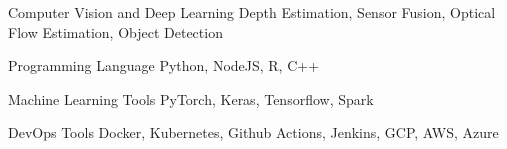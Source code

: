 

\begin{cvskills}

  \cvskill
    {Computer Vision and Deep Learning} %
    {Depth Estimation, Sensor Fusion, Optical Flow Estimation, Object Detection} %

  \cvskill
    {Programming Language} %
    {Python, NodeJS, R, C++} %

  \cvskill
    {Machine Learning Tools} %
    {PyTorch, Keras, Tensorflow, Spark} %

  \cvskill
    {DevOps Tools} %
    {Docker, Kubernetes, Github Actions, Jenkins, GCP, AWS, Azure} %

\end{cvskills}
